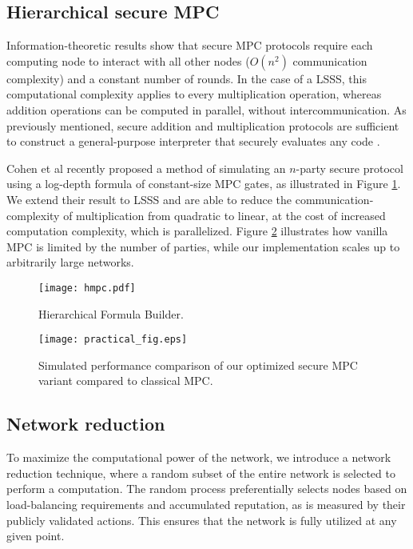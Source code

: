 \documentclass{article} \usepackage{nips13submit_e,times}
\begin{document}
\subsection{Hierarchical secure MPC}
\label{sec:hmpc}

Information-theoretic results show that secure MPC protocols require each computing node to interact with all other nodes ($O(n^2)$ communication complexity) and a constant number of rounds. In the case of a LSSS, this computational complexity applies to every multiplication operation, whereas addition operations can be computed in parallel, without intercommunication. As previously mentioned, secure addition and multiplication protocols are sufficient to construct a general-purpose interpreter that securely evaluates any code \cite{GBW88}.

Cohen et al \cite{cohen13} recently proposed a method of simulating an $n$-party secure protocol using a log-depth formula of constant-size MPC gates, as illustrated in Figure \ref{fig:builder2}. We extend their result to LSSS and are able to reduce the communication-complexity of multiplication from quadratic to linear, at the cost of increased computation complexity, which is parallelized. Figure \ref{fig:mpc_sim2} illustrates how vanilla MPC is limited by the number of parties, while our implementation scales up to arbitrarily large networks.



\begin{figure}[htbp]
\centering
\texttt{[image: hmpc.pdf]}
\caption{Hierarchical Formula Builder.}
\label{fig:builder2}
\end{figure}

\begin{figure}[htbp]
\texttt{[image: practical\_fig.eps]}
\caption{Simulated performance comparison of our optimized secure MPC variant compared to classical MPC.}
\label{fig:mpc_sim2}
\end{figure}

\subsection{Network reduction}

To maximize the computational power of the network, we introduce a network reduction technique, where a random subset of the entire network is selected to perform a computation. The random process preferentially selects nodes based on load-balancing requirements and accumulated reputation, as is measured by their publicly validated actions. This ensures that the network is fully utilized at any given point.
\end{document}
